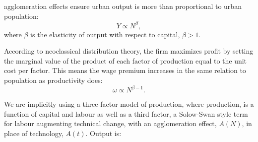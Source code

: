  \Glspl{agglomeration effect} ensure urban \gls{output} is more than proportional to urban population: 
 \begin{equation}
 Y\propto N^{\beta},
 \label{eqn-production-population}
 \end{equation}
where $\beta$ is the elasticity of output with respect to capital,  $\beta >1$.   

According to \gls{neoclassical distribution theory}, the firm maximizes profit by setting the marginal value of the product of each \gls{factor of production} equal to the unit cost per factor. This means the wage premium increases in the same relation to population as \gls{productivity} does:
\begin{equation}
\omega\propto N^{\beta-1}.
\label{eqn-wage-population}
\end{equation}



 
 We are implicitly using a three-factor model of \gls{production}, where production, is a function of capital and labour as well as a third factor, a Solow-Swan style term for labour augmenting technical change, with an \gls{agglomeration} effect, $A(N)$, in place of technology, $A(t)$. Output is:

